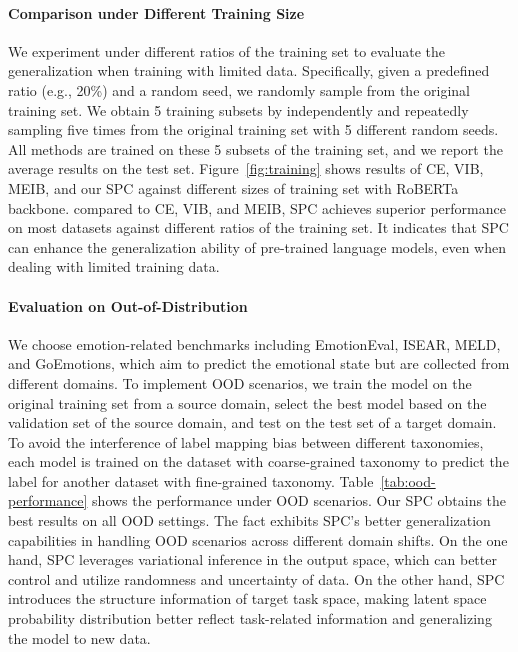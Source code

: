 \documentclass[letterpaper]{article} %
\begin{document}
\paragraph{Comparison under Different Training Size}
We experiment under different ratios of the training set to evaluate the generalization when training with limited data.
Specifically, given a predefined ratio (e.g., 20\%) and a random seed, we randomly sample from the original training set.
We obtain 5 training subsets by independently and repeatedly sampling five times from the original training set with 5 different random seeds.
All methods are trained on these 5 subsets of the training set, and we report the average results on the test set.
Figure~\ref{fig:training} shows results of CE, VIB, MEIB, and our SPC against different sizes of training set with RoBERTa backbone.
compared to CE, VIB, and MEIB, SPC achieves superior performance on most datasets against different ratios of the training set.
It indicates that SPC can enhance the generalization ability of pre-trained language models, even when dealing with limited training data.





\paragraph{Evaluation on Out-of-Distribution}
We choose emotion-related benchmarks including EmotionEval, ISEAR, MELD, and GoEmotions, which aim to predict the emotional state but are collected from different domains.
To implement OOD scenarios, we train the model on the original training set from a source domain, select the best model based on the validation set of the source domain, and test on the test set of a target domain.
To avoid the interference of label mapping bias between different taxonomies, each model is trained on the dataset with coarse-grained taxonomy to predict the label for another dataset with fine-grained taxonomy.
Table~\ref{tab:ood-performance} shows the performance under OOD scenarios.
Our SPC obtains the best results on all OOD settings. The fact exhibits SPC's better generalization capabilities in handling OOD scenarios across different domain shifts.
On the one hand, SPC leverages variational inference in the output space, which can better control and utilize randomness and uncertainty of data.
On the other hand, SPC introduces the structure information of target task space, making latent space probability distribution better reflect task-related information and generalizing the model to new data.
\end{document}
